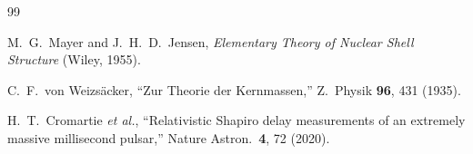 \documentclass[12pt,a4paper]{article}
\theoremstyle{definition}
\theoremstyle{remark}
\begin{document}
\begin{thebibliography}{99}

M.~G.~Mayer and J.~H.~D.~Jensen, \textit{Elementary Theory of
Nuclear Shell Structure} (Wiley, 1955).

C.~F.~von Weizs\"acker, ``Zur Theorie der Kernmassen,''
Z.\ Physik \textbf{96}, 431 (1935).

H.~T.~Cromartie \textit{et al.}, ``Relativistic Shapiro delay
measurements of an extremely massive millisecond pulsar,''
Nature Astron.\ \textbf{4}, 72 (2020).

\end{thebibliography}
\end{document}
